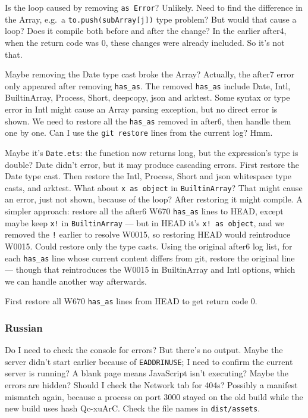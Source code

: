 \smallskip

\begin{decodedanswerpanel}
Is the loop caused by removing \texttt{as Error}? Unlikely. Need to find the difference
in the Array, e.g.\ a \texttt{to.push(subArray[j])} type problem? But would that cause a
loop? Does it compile both before and after the change? In the earlier after4, when the
return code was 0, these changes were already included. So it's not that.

Maybe removing the Date type cast broke the Array? Actually, the after7 error only
appeared after removing \texttt{has\_as}. The removed \texttt{has\_as} include Date, Intl,
BuiltinArray, Process, Short, deepcopy, json and arktest. Some syntax or type error in Intl
might cause an Array parsing exception, but no direct error is shown. We need to restore all
the \texttt{has\_as} removed in after6, then handle them one by one. Can I use the
\texttt{git restore} lines from the current log? Hmm.

Maybe it's \texttt{Date.ets}: the function now returns long, but the expression's type is
double? Date didn't error, but it may produce cascading errors. First restore the Date type
cast. Then restore the Intl, Process, Short and json whitespace type casts, and arktest.
What about \texttt{x as object} in \texttt{BuiltinArray}? That might cause an error, just not
shown, because of the loop? After restoring it might compile. A simpler approach: restore all
the after6 W670 \texttt{has\_as} lines to HEAD, except maybe keep \texttt{x!} in
\texttt{BuiltinArray} --- but in HEAD it's \texttt{x! as object}, and we removed the
\texttt{!} earlier to resolve W0015, so restoring HEAD would reintroduce W0015. Could restore
only the type casts. Using the original after6 log list, for each \texttt{has\_as} line whose
current content differs from git, restore the original line --- though that reintroduces the
W0015 in BuiltinArray and Intl options, which we can handle another way afterwards.

First restore all W670 \texttt{has\_as} lines from HEAD to get return code 0.
\end{decodedanswerpanel}

\subsubsection{Russian}

\begin{decodedanswerpanel}
Do I need to check the console for errors? But there's no output. Maybe the server didn't
start earlier because of \texttt{EADDRINUSE}; I need to confirm the current server is
running? A blank page means JavaScript isn't executing? Maybe the errors are hidden? Should
I check the Network tab for 404s? Possibly a manifest mismatch again, because a process on
port 3000 stayed on the old build while the new build uses hash Qc-xuArC. Check the file
names in \texttt{dist/assets}.
\end{decodedanswerpanel}

